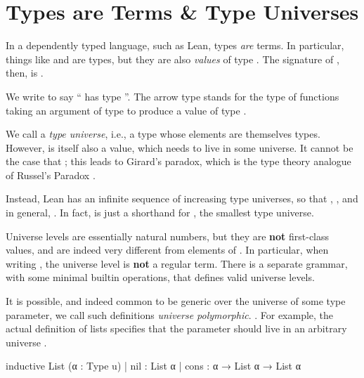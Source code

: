 \section{Types are Terms \& Type Universes}
In a dependently typed language, such as Lean, types \emph{are} terms. In particular, things like  and  are types, but they are also \emph{values} of type \Type.
The signature of , then, is .


\begin{remark}
    We write  to say `` has type ''.
    The arrow type  stands for the type of functions taking an argument of type 
    to produce a value of type .
\end{remark}

We call \Type{} a \emph{type universe}, i.e., a type whose elements are themselves types. However, \Type{} is itself also a value, which needs to live in some universe.
It cannot be the case that ; this leads to Girard's paradox, which is the type theory analogue of Russel's Paradox \cite{girardInterpretationFonctionelleElimination1972}.

Instead, Lean has an infinite sequence of increasing type universes, so that , , and in general, . In fact,  is just a shorthand for , the smallest type universe.

Universe levels  are essentially natural numbers, but they are \textbf{not} first-class values, and are indeed very different from elements of .
In particular, when writing , the universe level  is \textbf{not} a regular term. There is a separate grammar, with some minimal builtin operations, that defines valid universe levels.

It is possible, and indeed common to be generic over the universe of some type parameter, we call such 
definitions \emph{universe polymorphic}.
.
For example, the actual definition of lists specifies that the parameter  should live in an arbitrary universe .
\begin{leancode}
  inductive List (α : Type u)
    | nil  : List α
    | cons : α → List α → List α
\end{leancode}

